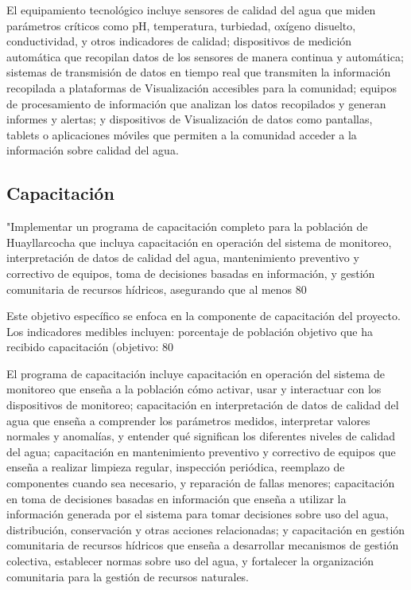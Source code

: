 El equipamiento tecnológico incluye sensores de calidad del agua que miden parámetros críticos como pH, temperatura, turbiedad, oxígeno disuelto, conductividad, y otros indicadores de calidad; dispositivos de medición automática que recopilan datos de los sensores de manera continua y automática; sistemas de transmisión de datos en tiempo real que transmiten la información recopilada a plataformas de Visualización accesibles para la comunidad; equipos de procesamiento de información que analizan los datos recopilados y generan informes y alertas; y dispositivos de Visualización de datos como pantallas, tablets o aplicaciones móviles que permiten a la comunidad acceder a la información sobre calidad del agua.

\subsection{Capacitación}

"Implementar un programa de capacitación completo para la población de Huayllarcocha que incluya capacitación en operación del sistema de monitoreo, interpretación de datos de calidad del agua, mantenimiento preventivo y correctivo de equipos, toma de decisiones basadas en información, y gestión comunitaria de recursos hídricos, asegurando que al menos 80%

Este objetivo específico se enfoca en la componente de capacitación del proyecto. Los indicadores medibles incluyen: porcentaje de población objetivo que ha recibido capacitación (objetivo: 80%

El programa de capacitación incluye capacitación en operación del sistema de monitoreo que enseña a la población cómo activar, usar y interactuar con los dispositivos de monitoreo; capacitación en interpretación de datos de calidad del agua que enseña a comprender los parámetros medidos, interpretar valores normales y anomalías, y entender qué significan los diferentes niveles de calidad del agua; capacitación en mantenimiento preventivo y correctivo de equipos que enseña a realizar limpieza regular, inspección periódica, reemplazo de componentes cuando sea necesario, y reparación de fallas menores; capacitación en toma de decisiones basadas en información que enseña a utilizar la información generada por el sistema para tomar decisiones sobre uso del agua, distribución, conservación y otras acciones relacionadas; y capacitación en gestión comunitaria de recursos hídricos que enseña a desarrollar mecanismos de gestión colectiva, establecer normas sobre uso del agua, y fortalecer la organización comunitaria para la gestión de recursos naturales.



